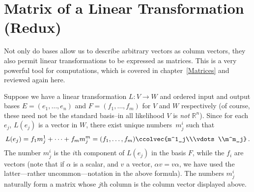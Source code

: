 \section{Matrix of a Linear Transformation (Redux)}

Not only do bases allow us to describe arbitrary vectors as column vectors, they also permit linear transformations
 to be expressed as matrices. This is a very powerful tool for computations, which is covered in chapter~\ref{Matrices} and
 reviewed again here.
 
Suppose we have a linear transformation $L \colon V\rightarrow W$ and 
ordered input and output bases $E=(e_1, \ldots, e_n)$ and $F=(f_1, \ldots, f_m)$ for $V$ and $W$ respectively (of course, these need not be the standard basis--in all likelihood $V$ is {\itshape not} ${\mathbb R}^n$). 
Since for each $e_j$, $L(e_j)$ is a vector in $W$, there exist unique  numbers~$m^i_j$ such that
\[
L(e_j)=f_1m^1_j + \cdots + f_mm^m_j =(f_1,\ldots, f_m) \ccolvec{m^1_j\\\vdots\\m^m_j}\, .
\]
The number $m^i_j$ is the $i$th component of $L(e_j)$ in the basis $F$, while the $f_i$ are vectors (note that if $\alpha$ is a scalar, and $v$ a vector, $\alpha v=v\alpha$, we have used the latter---rather uncommon---notation in the above formula).
The numbers $m^i_j$ naturally form a matrix whose $j$th column is the column vector displayed above. 
